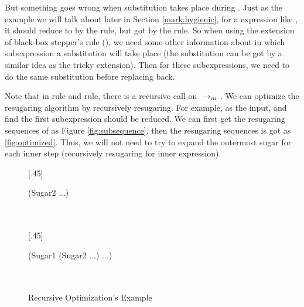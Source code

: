 {\begin{center}
\end{center}

But something goes wrong when substitution takes place during . Just as the example we will talk about later in Section \ref{mark:hygienic}, for a expression like , it should reduce to  by the  rule, but got  by the  rule. So when using the extension of black-box stepper's rule (), we need some other information about in which subexpression a substitution will take place (the substitution can be got by a similar idea as the tricky extension). Then for these subexpressions, we need to do the same substitution before replacing back.
}



\label{mark:optimize}
Note that in  rule and  rule, there is a recursive call on $~\rightarrow_m~$. We can optimize the resugaring algorithm by recursively resugaring. For example,  as the input, and find the first subexpression should be reduced. We can first get the resugaring sequences of  as Figure \ref{fig:subsequence}, then the resugaring sequences is got as \ref{fig:optimized}. Thus, we will not need to try to expand the outermost sugar for each inner step (recursively resugaring for inner expression).
\begin{figure}[t]
\centering
{}[.45\linewidth]{
\begin{flushleft}
{\small
\begin{Codes}
\qquad (Sugar2 ...)\\
  \\
 \\
\end{Codes} 
}
\end{flushleft}
}
[.45\linewidth]{
\begin{flushleft}
{\small
\begin{Codes}
\qquad (Sugar1 (Sugar2 ...) ...)\\
  \\
 \\
\end{Codes} 
}
\end{flushleft}
}
\caption{Recursive Optimization's Example}
\label{fig:optimize}
\end{figure}


